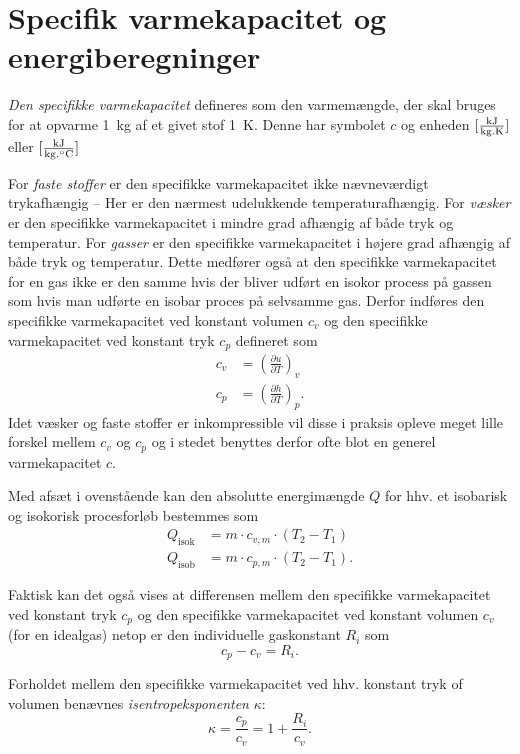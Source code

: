 \section{Specifik varmekapacitet og energiberegninger}
\begin{definition}
  \textit{Den specifikke varmekapacitet} defineres som den varmemængde, der skal bruges for at opvarme \qty{1}{kg} af et givet stof \qty{1}{K}. Denne har symbolet $c$ og enheden $[\unit{\frac{kJ}{\kg.\K}}]$ eller $[\unit{\frac{kJ}{\kg.\celsius}}]$
\end{definition}

For \textit{faste stoffer} er den specifikke varmekapacitet ikke nævneværdigt trykafhængig -- Her er den nærmest udelukkende temperaturafhængig. For \textit{væsker} er den specifikke varmekapacitet i mindre grad afhængig af både tryk og temperatur. For \textit{gasser} er den specifikke varmekapacitet i højere grad afhængig af både tryk og temperatur. Dette medfører også at den specifikke varmekapacitet for en gas ikke er den samme hvis der bliver udført en isokor process på gassen som hvis man udførte en isobar proces på selvsamme gas. Derfor indføres den specifikke varmekapacitet ved konstant volumen $c_v$ og den specifikke varmekapacitet ved konstant tryk $c_p$ defineret som
\begin{align*}
  c_v &= \left( \frac{\partial u}{\partial T} \right)_v \\
  c_p &= \left( \frac{\partial h}{\partial T} \right)_p
.\end{align*}
Idet væsker og faste stoffer er inkompressible vil disse i praksis opleve meget lille forskel mellem $c_v$ og $c_p$ og i stedet benyttes derfor ofte blot en generel varmekapacitet $c$. 

Med afsæt i ovenstående kan den absolutte energimængde $Q$ for hhv. et isobarisk og isokorisk procesforløb bestemmes som
\begin{align*}
  Q_{\text{isok}} &= m\cdot c_{v, m} \cdot \left( T_2 - T_1 \right) \\
  Q_{\text{isob}} &= m \cdot c_{p, m}\cdot \left( T_2 - T_1 \right)
.\end{align*}

Faktisk kan det også vises at differensen mellem den specifikke varmekapacitet ved konstant tryk $c_p$ og den specifikke varmekapacitet ved konstant volumen $c_v$ (for en idealgas) netop er den individuelle gaskonstant $R_i$ som
\[ 
c_p - c_v = R_i
.\]

Forholdet mellem den specifikke varmekapacitet ved hhv. konstant tryk of volumen benævnes \textit{isentropeksponenten} $\kappa$:
\[ 
\kappa = \frac{c_p}{c_v} = 1 + \frac{R_i}{c_v}
.\]
